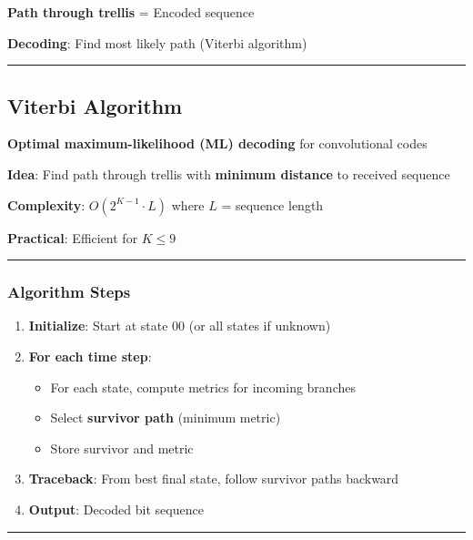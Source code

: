 \textbf{Path through trellis} = Encoded sequence

\textbf{Decoding}: Find most likely path (Viterbi algorithm)

\begin{center}\rule{0.5\linewidth}{0.5pt}\end{center}

\subsection{Viterbi Algorithm}\label{viterbi-algorithm}

\textbf{Optimal maximum-likelihood (ML) decoding} for convolutional
codes

\textbf{Idea}: Find path through trellis with \textbf{minimum distance}
to received sequence

\textbf{Complexity}: \(O(2^{K-1} \cdot L)\) where \(L\) = sequence
length

\textbf{Practical}: Efficient for \(K \leq 9\)

\begin{center}\rule{0.5\linewidth}{0.5pt}\end{center}

\subsubsection{Algorithm Steps}\label{algorithm-steps}

\begin{enumerate}
\def\labelenumi{\arabic{enumi}.}
\tightlist
\item
  \textbf{Initialize}: Start at state 00 (or all states if unknown)
\item
  \textbf{For each time step}:

  \begin{itemize}
  \tightlist
  \item
    For each state, compute metrics for incoming branches
  \item
    Select \textbf{survivor path} (minimum metric)
  \item
    Store survivor and metric
  \end{itemize}
\item
  \textbf{Traceback}: From best final state, follow survivor paths
  backward
\item
  \textbf{Output}: Decoded bit sequence
\end{enumerate}

\begin{center}\rule{0.5\linewidth}{0.5pt}\end{center}

